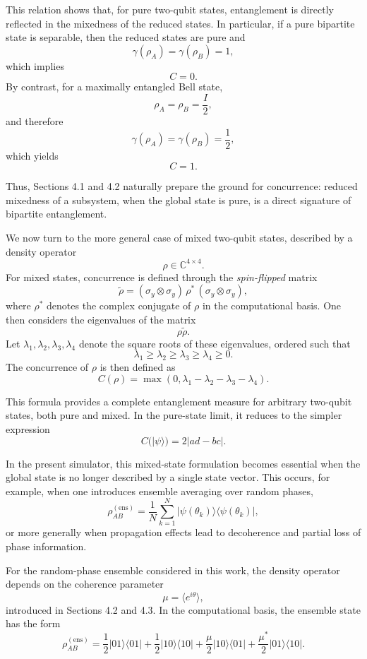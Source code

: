 \documentclass[a4paper]{article}
\begin{document}
This relation shows that, for pure two-qubit states, entanglement is directly reflected in the mixedness of the reduced states. In particular, if a pure bipartite state is separable, then the reduced states are pure and
\[
\gamma(\rho_A)=\gamma(\rho_B)=1,
\]
which implies
\[
C=0.
\]
By contrast, for a maximally entangled Bell state,
\[
\rho_A=\rho_B=\frac{I}{2},
\]
and therefore
\[
\gamma(\rho_A)=\gamma(\rho_B)=\frac{1}{2},
\]
which yields
\[
C=1.
\]

Thus, Sections 4.1 and 4.2 naturally prepare the ground for concurrence: reduced mixedness of a subsystem, when the global state is pure, is a direct signature of bipartite entanglement.

\medskip

We now turn to the more general case of mixed two-qubit states, described by a density operator
\[
\rho \in \mathbb{C}^{4\times 4}.
\]
For mixed states, concurrence is defined through the \emph{spin-flipped} matrix
\[
\tilde{\rho}
=
(\sigma_y \otimes \sigma_y)\,\rho^*\,(\sigma_y \otimes \sigma_y),
\]
where \(\rho^*\) denotes the complex conjugate of \(\rho\) in the computational basis. One then considers the eigenvalues of the matrix
\[
\rho \tilde{\rho}.
\]
Let \(\lambda_1,\lambda_2,\lambda_3,\lambda_4\) denote the square roots of these eigenvalues, ordered such that
\[
\lambda_1 \ge \lambda_2 \ge \lambda_3 \ge \lambda_4 \ge 0.
\]
The concurrence of \(\rho\) is then defined as
\[
C(\rho)
=
\max\!\left(0,\lambda_1-\lambda_2-\lambda_3-\lambda_4\right).
\]

This formula provides a complete entanglement measure for arbitrary two-qubit states, both pure and mixed. In the pure-state limit, it reduces to the simpler expression
\[
C(|\psi\rangle)=2|ad-bc|.
\]

\medskip

In the present simulator, this mixed-state formulation becomes essential when the global state is no longer described by a single state vector. This occurs, for example, when one introduces ensemble averaging over random phases,
\[
\rho_{AB}^{(\mathrm{ens})}
=
\frac{1}{N}
\sum_{k=1}^{N}
|\psi(\theta_k)\rangle\langle\psi(\theta_k)|,
\]
or more generally when propagation effects lead to decoherence and partial loss of phase information.

For the random-phase ensemble considered in this work, the density operator depends on the coherence parameter
\[
\mu = \langle e^{i\theta}\rangle,
\]
introduced in Sections 4.2 and 4.3. In the computational basis, the ensemble state has the form
\[
\rho_{AB}^{(\mathrm{ens})}
=
\frac{1}{2}|01\rangle\langle 01|
+
\frac{1}{2}|10\rangle\langle 10|
+
\frac{\mu}{2}|10\rangle\langle 01|
+
\frac{\mu^*}{2}|01\rangle\langle 10|.
\]
\end{document}
